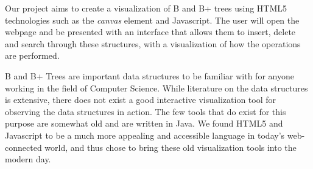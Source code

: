 
Our project aims to create a visualization of B and B+ trees using HTML5
technologies such as the \textit{canvas} element and Javascript. The user will open the
webpage and be presented with an interface that allows them to insert, delete
and search through these structures, with a visualization of how the
operations are performed.

B and B+ Trees are important data structures to be familiar with for
anyone working in the field of Computer Science. While literature on
the data structures is extensive, there does not exist a good
interactive visualization tool for observing the data structures in
action. The few tools that do exist for this purpose are somewhat old
and are written in Java. We found HTML5 and Javascript to be a much
more appealing and accessible language in today's web-connected world,
and thus chose to bring these old visualization tools into the modern day.


